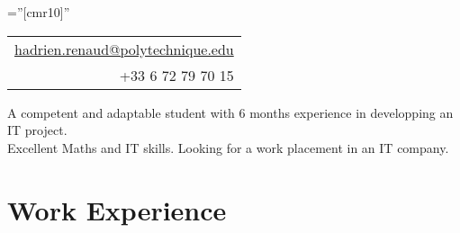 \documentclass[a4paper,10pt]{article} %
\begin{document}
\pagestyle{empty} %

\font\fb=''[cmr10]'' %



\par{\hfill{}\hfill
\begin{tabular}{r}
\href{mailto:hadrien.renaud@polytechnique.edu}{hadrien.renaud@polytechnique.edu}\\
+33 6 72 79 70 15
\end{tabular}
\bigskip\par} %
\vfill


A competent and adaptable student with 6 months experience in developping an IT project.\\
Excellent Maths and IT skills.
Looking for a work placement in an IT company.


\section{Work Experience}
\end{document}
